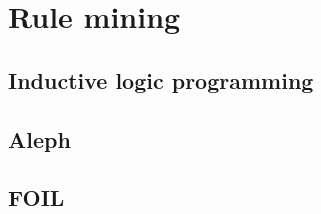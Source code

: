 
\chapter{Rule mining} %

\label{Chapter7} %




\section{Inductive logic programming}

\section{Aleph}

\section{FOIL}



